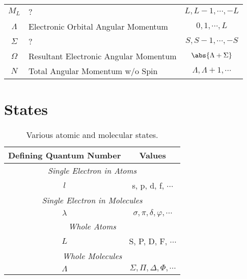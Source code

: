\documentclass[11pt, twoside, fleqn]{report}
\begin{document}
\begin{table}[H]
\begin{tabular}{clc}
            \cmidrule(lr){1-3}
            $M_L$   & ?                                     & $L, L - 1, \dotsb, -L$                      \\
            $\Lambda$ & Electronic Orbital Angular Momentum   & $0, 1, \dotsb, L$                           \\
            $\Sigma$  & ?                                     & $S, S - 1, \dotsb, -S$                      \\
            $\Omega$  & Resultant Electronic Angular Momentum & $\abs{\Lambda + \Sigma}$                    \\
            $N$       & Total Angular Momentum w/o Spin       & $\Lambda, \Lambda + 1, \dotsb$              \\
            \bottomrule
        \end{tabular}
    \end{table}

    \chapter{States}
    \label{a:states}

    \begin{table}[H]
        \centering
        \caption{Various atomic and molecular states.}
        \label{t:states}
        \begin{tabular}{cc}
            \toprule
            Defining Quantum Number & Values                                 \\
            \midrule
            \multicolumn{2}{c}{\textit{Single Electron in Atoms}}            \\
            \cmidrule(lr){1-2}
            $l$                     & s, p, d, f, $\dotsb$                   \\
            \multicolumn{2}{c}{\textit{Single Electron in Molecules}}        \\
            \cmidrule(lr){1-2}
            $\lambda$               & $\sigma, \pi, \delta, \varphi, \dotsb$ \\
            \multicolumn{2}{c}{\textit{Whole Atoms}}                         \\
            \cmidrule(lr){1-2}
            $L$                     & S, P, D, F, $\dotsb$                   \\
            \multicolumn{2}{c}{\textit{Whole Molecules}}                     \\
            \cmidrule(lr){1-2}
            $\Lambda$               & $\Sigma, \Pi, \Delta, \Phi, \dotsb$    \\
            \bottomrule
        \end{tabular}
    \end{table}

    \printbibliography

    
\end{document}
